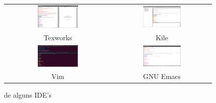 \begin{figure}[!htb]
    \centering
    \begin{tabular}{cc}
        \includegraphics[width=0.4\textwidth]{../../figures/texworks.png} &
        \includegraphics[width=0.4\textwidth]{../../figures/kile.png} \\
        Texworks & Kile \\
        \includegraphics[width=0.4\textwidth]{../../figures/vim.png} &
        \includegraphics[width=0.4\textwidth]{../../figures/gnu_emacs.png} \\
        Vim & GNU Emacs
    \end{tabular}
    \caption{ de alguns IDE's}
    \label{fig:ide_screenshot}
\end{figure}

